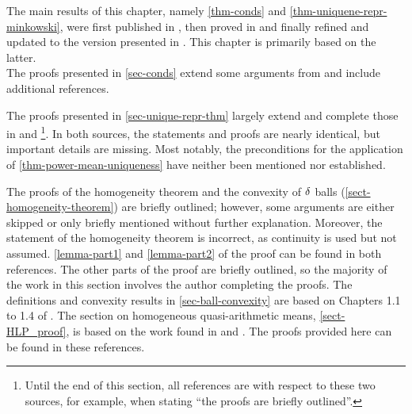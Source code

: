 \begin{sourcescontribs} \label{sec-combining-sources}
  The main results of this chapter, namely \cref{thm-conds} and \cref{thm-uniquene-repr-minkowski}, were first published in \textcite{foundationsMDS}, then proved in \textcite{tversky1970dimensional} and finally refined and updated to the version presented in \textcite[Chapter 14.4.5, pp. 185-187]{foundations2}.
  This chapter is primarily based on the latter.\\
  The proofs presented in \cref{sec-conds} extend some arguments from \textcite[pp. 192-194]{foundations2} and include additional references.

  The proofs presented in \cref{sec-unique-repr-thm} largely extend and complete those in \textcite[pp. 195-199]{foundations2} and \textcite[pp. 589-593]{tversky1970dimensional}\footnote{Until the end of this section, all references are with respect to these two sources, for example, when stating ``the proofs are briefly outlined''.}. In both sources, the statements and proofs are nearly identical, but important details are missing. Most notably, the preconditions for the application of \cref{thm-power-mean-uniqueness} have neither been mentioned nor established.

  The proofs of the homogeneity theorem and the convexity of $\operatorname{\delta}$ balls (\cref{sect-homogeneity-theorem}) are briefly outlined; however, some arguments are either skipped or only briefly mentioned without further explanation.
  Moreover, the statement of the homogeneity theorem is incorrect, as continuity is used but not assumed.
  \cref{lemma-part1} and \cref{lemma-part2} of the proof can be found in both references. The other parts of the proof are briefly outlined, so the majority of the work in this section involves the author completing the proofs.
  The definitions and convexity results in \cref{sec-ball-convexity} are based on Chapters 1.1 to 1.4 of \textcite[pp. 1-38]{lecturesConvGeo}.
  The section on homogeneous quasi-arithmetic means, \cref{sect-HLP_proof}, is based on the work found in \textcite[pp. 66-69]{hardy1952inequalities} and \textcite[pp. 271-273]{handbookMeans}. The proofs provided here can be found in these references.

\end{sourcescontribs}
